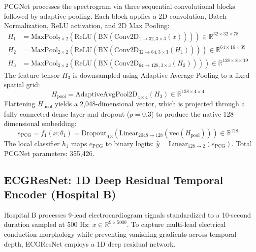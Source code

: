 \documentclass[12pt,a4paper]{amritareport}
\begin{document}
PCGNet processes the spectrogram via three sequential convolutional blocks followed by adaptive pooling. Each block applies a 2D convolution, Batch Normalization, ReLU activation, and 2D Max Pooling:
\begin{align}
	H_1 &= \text{MaxPool}_{2 \times 2}\left(\text{ReLU}\left(\text{BN}\left(\text{Conv2D}_{1 \rightarrow 32, 3 \times 3}(x)\right)\right)\right) \in \mathbb{R}^{32 \times 32 \times 78} \\
	H_2 &= \text{MaxPool}_{2 \times 2}\left(\text{ReLU}\left(\text{BN}\left(\text{Conv2D}_{32 \rightarrow 64, 3 \times 3}(H_1)\right)\right)\right) \in \mathbb{R}^{64 \times 16 \times 39} \\
	H_3 &= \text{MaxPool}_{2 \times 2}\left(\text{ReLU}\left(\text{BN}\left(\text{Conv2D}_{64 \rightarrow 128, 3 \times 3}(H_2)\right)\right)\right) \in \mathbb{R}^{128 \times 8 \times 19}
\end{align}
The feature tensor $H_3$ is downsampled using Adaptive Average Pooling to a fixed spatial grid:
\begin{equation}
	H_{\text{pool}} = \text{AdaptiveAvgPool2D}_{4 \times 4}(H_3) \in \mathbb{R}^{128 \times 4 \times 4}
\end{equation}
Flattening $H_{\text{pool}}$ yields a 2,048-dimensional vector, which is projected through a fully connected dense layer and dropout ($p=0.3$) to produce the native 128-dimensional embedding:
\begin{equation}
	e_{\text{PCG}} = f_1(x; \theta_1) = \text{Dropout}_{0.3}\left(\text{Linear}_{2048 \rightarrow 128}(\text{vec}(H_{\text{pool}}))\right) \in \mathbb{R}^{128}
\end{equation}
The local classifier $h_1$ maps $e_{\text{PCG}}$ to binary logits: $\hat{y} = \text{Linear}_{128 \rightarrow 2}(e_{\text{PCG}})$. Total PCGNet parameters: 355,426.

\subsection{ECGResNet: 1D Deep Residual Temporal Encoder (Hospital B)}
Hospital B processes 9-lead electrocardiogram signals standardized to a 10-second duration sampled at 500 Hz: $x \in \mathbb{R}^{9 \times 5000}$. To capture multi-lead electrical conduction morphology while preventing vanishing gradients across temporal depth, ECGResNet employs a 1D deep residual network.
\end{document}
